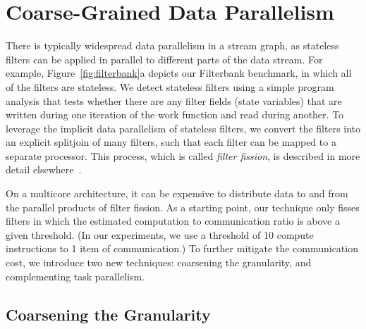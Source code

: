 \section{Coarse-Grained Data Parallelism}

There is typically widespread data parallelism in a stream graph, as
stateless filters can be applied in parallel to different parts of the
data stream.  For example, Figure~\ref{fig:filterbank}a depicts
our Filterbank benchmark, in which all of the filters are stateless.
We detect stateless filters using a simple program analysis that tests
whether there are any filter fields (state variables) that are written
during one iteration of the work function and read during another.  To
leverage the implicit data parallelism of stateless filters, we
convert the filters into an explicit splitjoin of many filters, such
that each filter can be mapped to a separate processor.  This process,
which is called {\it filter fission}, is described in more detail
elsewhere~\cite{streamit-asplos}.

\begin{figure*}[t]
\begin{center}
\vspace{-16pt}
\end{center}
\caption{Exploiting coarse-grained data parallelism in the FilterBank
benchmark.  Only one pipeline of the toplevel splitjoin is shown; the
other parallel streams are identical and are transformed in the same
way. \label{fig:filterbank}}
\vspace{-6pt}
\end{figure*}

On a multicore architecture, it can be expensive to distribute data to
and from the parallel products of filter fission.  As a starting
point, our technique only fisses filters in which the estimated
computation to communication ratio is above a given threshold.  (In
our experiments, we use a threshold of 10 compute instructions to 1
item of communication.)  To further mitigate the communication cost,
we introduce two new techniques: coarsening the granularity, and
complementing task parallelism.

\subsection{Coarsening the Granularity}

